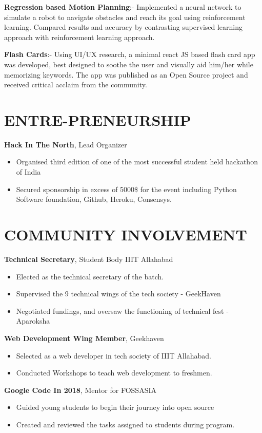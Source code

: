 \documentclass[margin, 7pt]{res} %
\begin{document}
\begin{resume}
\textbf{Regression based Motion Planning}:- Implemented a neural network to simulate a robot to navigate obstacles and reach its goal using reinforcement learning. Compared results and accuracy by contrasting supervised learning approach with reinforcement learning approach.

\textbf{Flash Cards}:- Using UI/UX research, a minimal react JS based flash card app was developed, best designed to soothe the user and visually aid him/her while memorizing keywords. The app was published as an Open Source project and received critical acclaim from the community.


\section{ENTRE-PRENEURSHIP}
\textbf{Hack In The North}, Lead Organizer
\begin{itemize}
    \item Organised third edition of one of the most successful student held hackathon of India
    \item Secured sponsorship in excess of 5000\$ for the event including Python Software foundation, Github, Heroku, Consensys.
\end{itemize}


\section{COMMUNITY INVOLVEMENT}

\textbf{Technical Secretary}, Student Body IIIT Allahabad 
\begin{itemize}
    \item Elected as the technical secretary of the batch.
    \item Supervised the 9 technical wings of the tech society - GeekHaven
    \item Negotiated fundings, and oversaw the functioning of technical fest - Aparoksha
\end{itemize}
\textbf{Web Development Wing Member}, Geekhaven
\begin{itemize}
    \item Selected as a web developer in tech society of IIIT Allahabad.
    \item Conducted Workshops to teach web development to freshmen.
\end{itemize}
\textbf{Google Code In 2018}, Mentor for FOSSASIA
\begin{itemize}
    \item Guided young students to begin their journey into open source
    \item Created and reviewed the tasks assigned to students during program.
\end{itemize}


\end{resume}
\end{document}
